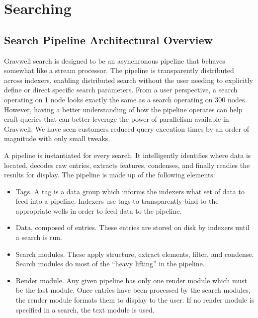 \chapter{Searching}

\section{Search Pipeline Architectural Overview}

Gravwell search is designed to be an asynchronous pipeline that behaves
somewhat like a stream processor. The pipeline is transparently
distributed across indexers, enabling distributed search without the
user needing to explicitly define or direct specific search parameters.
From a user perspective, a search operating on 1 node looks exactly the
same as a search operating on 300 nodes. However, having a better
understanding of how the pipeline operates can help craft queries that
can better leverage the power of parallelism available in Gravwell. We
have seen customers reduced query execution times by an order of
magnitude with only small tweaks.

A pipeline is instantiated for every search. It intelligently
identifies where data is located, decodes raw entries, extracts
features, condenses, and finally readies the results for display. The
pipeline is made up of the following elements:

\begin{itemize}
\item
  Tags. A tag is a data group which informs the indexers what set of
  data to feed into a pipeline. Indexers use tags to transparently bind
  to the appropriate wells in order to feed data to the pipeline.
\item
  Data, composed of entries. These entries are stored on disk by
  indexers until a search is run.
\item
  Search modules. These apply structure, extract elements, filter, and
  condense. Search modules do most of the ``heavy lifting'' in the
  pipeline.
\item
  Render module. Any given pipeline has only one render module which
  must be the last module. Once entries have been processed by the
  search modules, the render module formats them to display to the user.
  If no render module is specified in a search, the text module is
  used.
\end{itemize}

